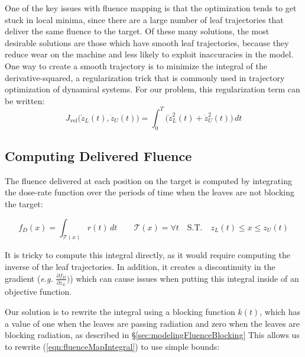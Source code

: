 One of the key issues with fluence mapping is that the
optimization tends to get stuck in local minima,
since there are a large number of leaf trajectories that deliver the same fluence to the target.
Of these many solutions, the most desirable solutions are those which have smooth leaf trajectories,
because they reduce wear on the machine and less likely to exploit inaccuracies in the model.
One way to create a smooth trajectory is to minimize the integral of the derivative-squared,
a regularization trick that is commonly used in trajectory optimization of dynamical systems.
For our problem, this regularization term can be written:
\begin{equation}
  J_\text{vel}\big(\dot{z}_L(t), \dot{z}_U(t)\big)
    = \int_0^T \! \big( \dot{z}_L^2(t) + \dot{z}_U^2(t) \big) \,dt
\end{equation}

\subsection{Computing Delivered Fluence}

The fluence delivered at each position on the target is computed by integrating the
dose-rate function over the periods of time when the leaves are not blocking the target:

\begin{equation}
  f_D(x) = \int_{\mathcal{T}(x)} \! r(t) \,dt
  \quad \quad
  \mathcal{T}(x) = \forall t
  \quad
  \text{S.T.}
  \quad
  z_L(t) \leq x \leq z_U(t)
  \label{eqn:fluenceMapIntegral}
\end{equation}

It is tricky to compute this integral directly, as it would require computing
the inverse of the leaf trajectories.
In addition, it creates a discontinuity in the gradient
(\textit{e.g.} $\tfrac{\partial f_D}{\partial z_L})$)
which can cause issues when putting this integral inside of an objective function.

Our solution is to rewrite the integral using a blocking function $k(t)$,
which has a value of one when the leaves are passing radiation and
zero when the leaves are blocking radiation, as described in \S\ref{sec:modelingFluenceBlocking}
This allows us to rewrite (\ref{eqn:fluenceMapIntegral}) to use simple bounds:

